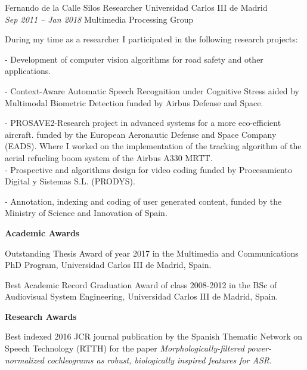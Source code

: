 \documentclass[10pt]{scrartcl}
\begin{document}
\begin{cv}{\spacedallcaps Fernando de la Calle Silos}
{\color{Maroon} Researcher} \hfill   Universidad Carlos III de Madrid\\
\textit{Sep 2011 -- Jan 2018} \hfill Multimedia Processing Group \vspace{0.5em}

During my time as a researcher I participated in the following research projects:

- Development of computer vision algorithms for road safety and other applications.

- {Context-Aware Automatic Speech Recognition under Cognitive Stress aided by Multimodal Biometric Detection} funded by Airbus Defense and Space.

- {PROSAVE2-Research project in advanced systems for a more eco-efficient aircraft.} funded by the European Aeronautic Defense and Space Company (EADS). Where I worked on the implementation of the tracking algorithm of the aerial refueling boom system of the Airbus A330 MRTT.\\	
- {Prospective and algorithms design for video coding} funded by  Procesamiento Digital y Sistemas S.L. (PRODYS). 
	
- {Annotation, indexing and coding of user generated content}, funded by the Ministry of Science and Innovation of Spain.	




\vspace{1.5em}

{\bfseries{}Academic Awards} 

\vspace{0.5em}
{\color{Maroon}Outstanding Thesis Award} of year 2017 in the Multimedia and Communications PhD Program, Universidad Carlos III de Madrid, Spain.

\vspace{0.5em}
{\color{Maroon}Best Academic Record Graduation Award} of class 2008-2012 in the BSc of Audiovisual System Engineering, Universidad Carlos III de Madrid, Spain.

\vspace{1em}

{\bfseries{}Research Awards}

\vspace{0.5em}
Best indexed 2016 JCR journal publication by the Spanish Thematic Network on Speech Technology  (RTTH) for the paper \textit{Morphologically-filtered power-normalized cochleograms as robust, biologically inspired features for ASR}.


\end{cv}
\end{document}
